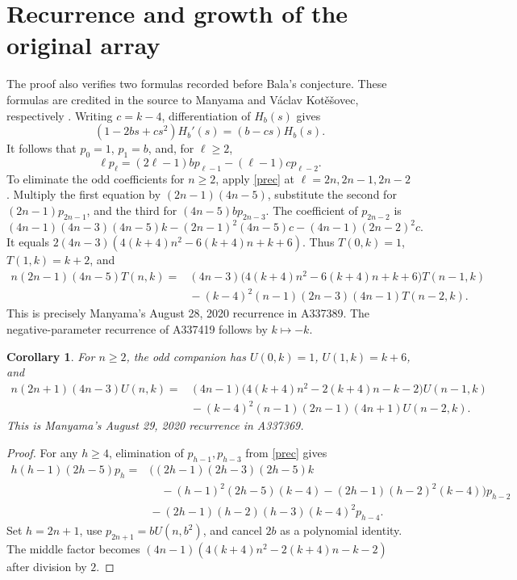 \documentclass[11pt]{article}
\newtheorem{corollary}[theorem]{Corollary}
\begin{document}
\section{Recurrence and growth of the original array}
The proof also verifies two formulas recorded before Bala's conjecture.
These formulas are credited in the source to Manyama and
V\'aclav Kot\v e\v sovec, respectively \cite{array}.
Writing $c=k-4$, differentiation of $H_b(s)$ gives
\[
 (1-2bs+cs^2)H_b'(s)=(b-cs)H_b(s).
\]
It follows that $p_0=1$, $p_1=b$, and, for $\ell\geq2$,
\begin{equation}\label{prec}
 \ell p_\ell=(2\ell-1)b p_{\ell-1}-(\ell-1)c p_{\ell-2}.
\end{equation}
To eliminate the odd coefficients for $n\geq2$, apply \eqref{prec}
at $\ell=2n,2n-1,2n-2$. Multiply the first equation by
$(2n-1)(4n-5)$, substitute the second for
$(2n-1)p_{2n-1}$, and the third for
$(4n-5)b p_{2n-3}$. The coefficient of $p_{2n-2}$ is
\[
 (4n-1)(4n-3)(4n-5)k
 -(2n-1)^2(4n-5)c-(4n-1)(2n-2)^2c.
\]
It equals $2(4n-3)(4(k+4)n^2-6(k+4)n+k+6)$.
Thus $T(0,k)=1$, $T(1,k)=k+2$, and
\begin{align}
 n(2n-1)(4n-5)T(n,k)
  ={}&(4n-3)\big(4(k+4)n^2-6(k+4)n+k+6\big)T(n-1,k)
 \nonumber\\[-2pt]
 &{}-(k-4)^2(n-1)(2n-3)(4n-1)T(n-2,k).
 \label{rec}
\end{align}
This is precisely Manyama's August 28, 2020 recurrence in A337389.
The negative-parameter recurrence of A337419 follows by $k\mapsto-k$.

\begin{corollary}\label{oddrec}
For $n\geq2$, the odd companion has $U(0,k)=1$, $U(1,k)=k+6$, and
\begin{align*}
 n(2n+1)(4n-3)U(n,k)
 ={}&(4n-1)\bigl(4(k+4)n^2-2(k+4)n-k-2\bigr)U(n-1,k)\\
 &{}-(k-4)^2(n-1)(2n-1)(4n+1)U(n-2,k).
\end{align*}
This is Manyama's August 29, 2020 recurrence in A337369.
\end{corollary}
\begin{proof}
For any $h\geq4$, elimination of $p_{h-1},p_{h-3}$ from
\eqref{prec} gives
\begin{align*}
 h(h-1)(2h-5)p_h
 ={}&\bigl((2h-1)(2h-3)(2h-5)k\\
 &\quad -(h-1)^2(2h-5)(k-4)
              -(2h-1)(h-2)^2(k-4)\bigr)p_{h-2}\\
 &{}-(2h-1)(h-2)(h-3)(k-4)^2p_{h-4}.
\end{align*}
Set $h=2n+1$, use $p_{2n+1}=bU(n,b^2)$, and cancel $2b$
as a polynomial identity. The middle factor becomes
$(4n-1)(4(k+4)n^2-2(k+4)n-k-2)$ after division by $2$.
\end{proof}
\end{document}
